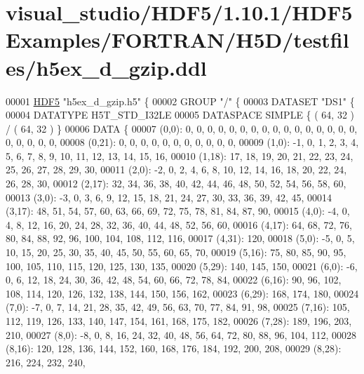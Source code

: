 \hypertarget{visual__studio_2_h_d_f5_21_810_81_2_h_d_f5_examples_2_f_o_r_t_r_a_n_2_h5_d_2testfiles_2h5ex__d__gzip_8ddl_source}{}\section{visual\+\_\+studio/\+H\+D\+F5/1.10.1/\+H\+D\+F5\+Examples/\+F\+O\+R\+T\+R\+A\+N/\+H5\+D/testfiles/h5ex\+\_\+d\+\_\+gzip.ddl}
\label{visual__studio_2_h_d_f5_21_810_81_2_h_d_f5_examples_2_f_o_r_t_r_a_n_2_h5_d_2testfiles_2h5ex__d__gzip_8ddl_source}

\begin{DoxyCode}
00001 \hyperlink{namespace_h_d_f5}{HDF5} \textcolor{stringliteral}{"h5ex\_d\_gzip.h5"} \{
00002 GROUP \textcolor{stringliteral}{"/"} \{
00003    DATASET \textcolor{stringliteral}{"DS1"} \{
00004       DATATYPE  H5T\_STD\_I32LE
00005       DATASPACE  SIMPLE \{ ( 64, 32 ) / ( 64, 32 ) \}
00006       DATA \{
00007       (0,0): 0, 0, 0, 0, 0, 0, 0, 0, 0, 0, 0, 0, 0, 0, 0, 0, 0, 0, 0, 0, 0,
00008       (0,21): 0, 0, 0, 0, 0, 0, 0, 0, 0, 0, 0,
00009       (1,0): -1, 0, 1, 2, 3, 4, 5, 6, 7, 8, 9, 10, 11, 12, 13, 14, 15, 16,
00010       (1,18): 17, 18, 19, 20, 21, 22, 23, 24, 25, 26, 27, 28, 29, 30,
00011       (2,0): -2, 0, 2, 4, 6, 8, 10, 12, 14, 16, 18, 20, 22, 24, 26, 28, 30,
00012       (2,17): 32, 34, 36, 38, 40, 42, 44, 46, 48, 50, 52, 54, 56, 58, 60,
00013       (3,0): -3, 0, 3, 6, 9, 12, 15, 18, 21, 24, 27, 30, 33, 36, 39, 42, 45,
00014       (3,17): 48, 51, 54, 57, 60, 63, 66, 69, 72, 75, 78, 81, 84, 87, 90,
00015       (4,0): -4, 0, 4, 8, 12, 16, 20, 24, 28, 32, 36, 40, 44, 48, 52, 56, 60,
00016       (4,17): 64, 68, 72, 76, 80, 84, 88, 92, 96, 100, 104, 108, 112, 116,
00017       (4,31): 120,
00018       (5,0): -5, 0, 5, 10, 15, 20, 25, 30, 35, 40, 45, 50, 55, 60, 65, 70,
00019       (5,16): 75, 80, 85, 90, 95, 100, 105, 110, 115, 120, 125, 130, 135,
00020       (5,29): 140, 145, 150,
00021       (6,0): -6, 0, 6, 12, 18, 24, 30, 36, 42, 48, 54, 60, 66, 72, 78, 84,
00022       (6,16): 90, 96, 102, 108, 114, 120, 126, 132, 138, 144, 150, 156, 162,
00023       (6,29): 168, 174, 180,
00024       (7,0): -7, 0, 7, 14, 21, 28, 35, 42, 49, 56, 63, 70, 77, 84, 91, 98,
00025       (7,16): 105, 112, 119, 126, 133, 140, 147, 154, 161, 168, 175, 182,
00026       (7,28): 189, 196, 203, 210,
00027       (8,0): -8, 0, 8, 16, 24, 32, 40, 48, 56, 64, 72, 80, 88, 96, 104, 112,
00028       (8,16): 120, 128, 136, 144, 152, 160, 168, 176, 184, 192, 200, 208,
00029       (8,28): 216, 224, 232, 240,

\end{DoxyCode}
